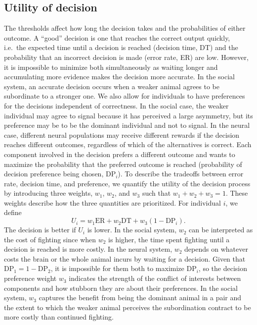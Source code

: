 \documentclass{pnastwo}
\begin{document}
\begin{article}
\subsection{Utility of decision}
The thresholds affect how long the decision takes and the probabilities of either outcome.  A ``good'' decision is one that reaches the correct output quickly, i.e.\ the expected time until a decision is reached (decision time, DT) and the probability that an incorrect decision is made (error rate, ER) are low.  However, it is impossible to minimize both simultaneously as waiting longer and accumulating more evidence makes the decision more accurate.  In the social system, an accurate decision occurs when a weaker animal agrees to be subordinate to a stronger one. We also allow for individuals to have preferences for the decisions independent of correctness.  In the social case, the weaker individual may agree to signal because it has perceived a large asymmetry, but its preference may be to be the dominant individual and not to signal. In the neural case, different neural populations may receive different rewards if the decision reaches different outcomes, regardless of which of the alternatives is correct. Each component involved in the decision prefers a different outcome and wants to maximize the probability that the preferred outcome is reached (probability of decision preference being chosen, $\text{DP}_i$). 
To describe the tradeoffs between error rate, decision time, and preference, we quantify the utility of the decision process by introducing three weights, $w_1$, $w_2$, and $w_3$ such that $w_1+w_2+w_3=1$.  These weights describe how the three quantities are prioritized.  For individual $i$, we define
\begin{equation*}
U_{i}=w_1\text{ER}+w_2\text{DT}+w_3(1-\text{DP}_i).
\end{equation*}
The decision is better if $U_i$ is lower.  In the social system, $w_2$ can be interpreted as the cost of fighting since when $w_2$ is higher, the time spent fighting until a decision is reached is more costly.  In the neural system, $w_2$ depends on whatever costs the brain or the whole animal incurs by waiting for a decision. Given that $\text{DP}_1=1-\text{DP}_2$, it is impossible for them both to maximize $\text{DP}_i$, so the decision preference weight $w_3$ indicates the strength of the conflict of interests between components and how stubborn they are about their preferences. In the social system, $w_3$ captures the benefit from being the dominant animal in a pair and the extent to which the weaker animal perceives the subordination contract to be more costly than continued fighting.  


\end{article}
\end{document}
